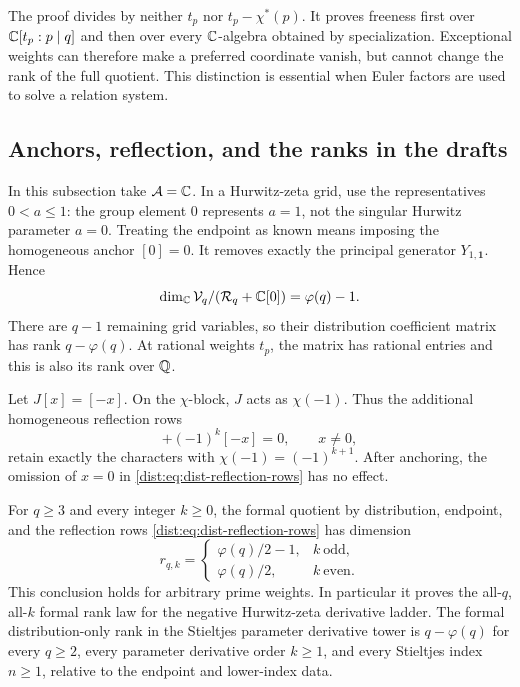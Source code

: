 \begin{remark}
The proof divides by neither \(t_p\) nor \(t_p-\chi^*(p)\).
It proves freeness first over \(\mathbb C[t_p:p\mid q]\) and then over
every \(\mathbb C\)-algebra obtained by specialization. Exceptional weights
can therefore make a preferred coordinate vanish, but cannot change
the rank of the full quotient. This distinction is essential when
Euler factors are used to solve a relation system.
\end{remark}

\subsection{Anchors, reflection, and the ranks in the drafts}

In this subsection take \(\mathcal A=\mathbb C\).
In a Hurwitz-zeta grid, use the representatives \(0<a\leq1\):
the group element \(0\) represents \(a=1\), not the singular
Hurwitz parameter \(a=0\). Treating the endpoint as known means
imposing the homogeneous anchor \([0]=0\). It removes exactly the
principal generator \(Y_{1,\mathbf1}\). Hence
\begin{equation}
 \dim_\mathbb C\mathcal V_q/(\mathcal R_q+\mathbb C[0])=\varphi(q)-1.
 \label{dist:eq:dist-anchor-dimension}
\end{equation}
There are \(q-1\) remaining grid variables, so their distribution
coefficient matrix has rank \(q-\varphi(q)\). At rational weights
\(t_p\), the matrix has rational entries and this is also its rank
over \(\mathbb{Q}\).

Let \(J[x]=[-x]\). On the \(\chi\)-block, \(J\) acts as
\(\chi(-1)\). Thus the additional homogeneous reflection rows
\begin{equation}
 [x]+(-1)^k[-x]=0,\qquad x\ne0,
 \label{dist:eq:dist-reflection-rows}
\end{equation}
retain exactly the characters with
\(\chi(-1)=(-1)^{k+1}\). After anchoring, the omission of \(x=0\)
in \eqref{dist:eq:dist-reflection-rows} has no effect.

\begin{corollary}
\label{dist:cor:dist-all-ranks}
For \(q\geq3\) and every integer \(k\geq0\), the formal quotient
by distribution, endpoint, and the reflection rows
\eqref{dist:eq:dist-reflection-rows} has dimension
\begin{equation}
 r_{q,k}=
 \begin{cases}
 \varphi(q)/2-1,&k\ \text{odd},\\
 \varphi(q)/2,&k\ \text{even}.
 \end{cases}
 \label{dist:eq:dist-parity-dimension}
\end{equation}
This conclusion holds for arbitrary prime weights.
In particular it proves the all-\(q\), all-\(k\) formal rank law
for the negative Hurwitz-zeta derivative ladder.
The formal distribution-only rank in the Stieltjes parameter
derivative tower is \(q-\varphi(q)\) for every \(q\geq2\),
every parameter derivative order \(k\geq1\), and every Stieltjes
index \(n\geq1\), relative to the endpoint and lower-index data.
\end{corollary}

